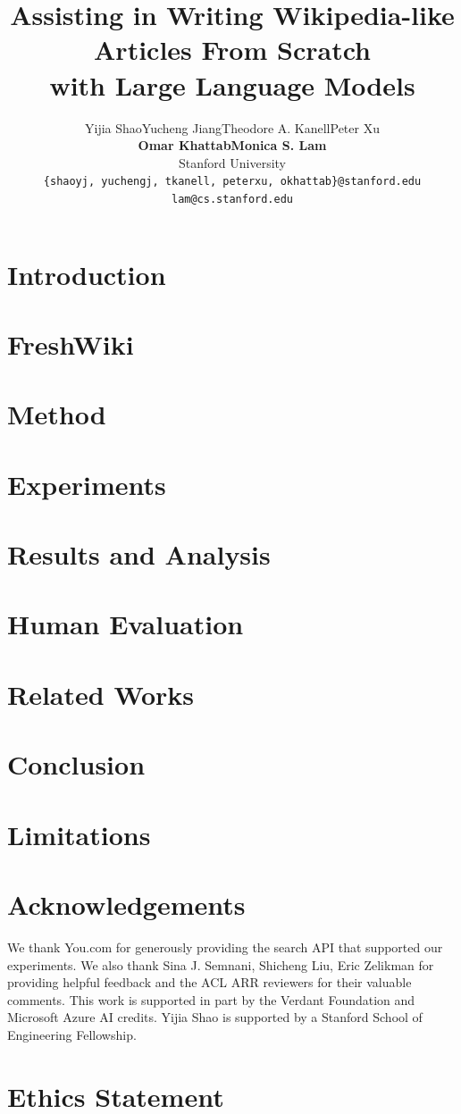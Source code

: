 \documentclass[11pt]{article}
\title{Assisting in Writing Wikipedia-like Articles From Scratch \\ with Large Language Models}
\author{Yijia Shao\quad Yucheng Jiang\quad Theodore A. Kanell\quad Peter Xu\\\textbf{Omar Khattab}\quad \textbf{Monica S. Lam}\\
Stanford University\\
\texttt{\{shaoyj, yuchengj, tkanell, peterxu, okhattab\}@stanford.edu}\\
\texttt{lam@cs.stanford.edu}}
\begin{document}
\maketitle
\begin{abstract}

\end{abstract}

\section{Introduction}


\section{FreshWiki}


\section{Method}


\section{Experiments}


\section{Results and Analysis}


\section{Human Evaluation}


\section{Related Works}


\section{Conclusion}


\section*{Limitations}


\section*{Acknowledgements}
We thank You.com for generously providing the search API that supported our experiments. We also thank Sina J. Semnani, Shicheng Liu, Eric Zelikman for providing helpful feedback and the ACL ARR reviewers for their valuable comments. This work is supported in part by the Verdant Foundation and Microsoft Azure AI credits. Yijia Shao is supported by a Stanford School of Engineering Fellowship.

\section*{Ethics Statement}





\clearpage
\appendix

\end{document}

